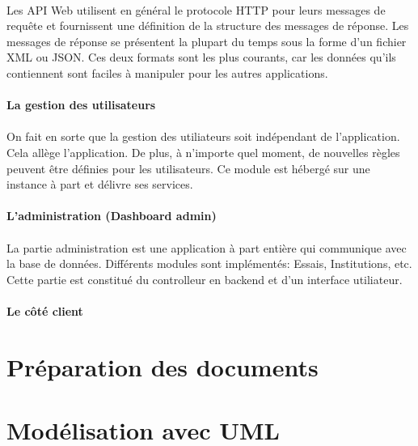                 \paragraph{}
                Les API Web utilisent en général le protocole HTTP pour leurs messages de requête et fournissent une 
                définition de la structure des messages de réponse. Les messages de réponse se présentent 
                la plupart du temps sous la forme d'un fichier XML ou JSON. Ces deux formats sont les plus courants, 
                car les données qu'ils contiennent sont faciles à manipuler pour les autres applications.
                \paragraph{La gestion des utilisateurs}
                \paragraph{}
                On fait en sorte que la gestion des utiliateurs soit indépendant de l'application.
                Cela allège l'application. De plus, à n'importe quel moment, de nouvelles règles peuvent être définies
                pour les utilisateurs. Ce module est hébergé sur une instance à part et délivre ses services.
                \paragraph{L'administration (Dashboard admin)}
                \paragraph{}
                La partie administration est une application à part entière qui communique avec la base de données.
                Différents modules sont implémentés: Essais, Institutions, etc. Cette partie est constitué du controlleur
                en backend et d'un interface utiliateur.
                \paragraph{Le côté client}
                

        \section{Préparation des documents}
                
        \section{Modélisation avec UML}
        
        
 